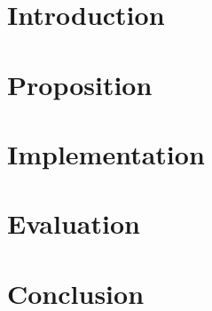 \section{Introduction}


\section{Proposition}


\section{Implementation}


\section{Evaluation}


\section{Conclusion}

